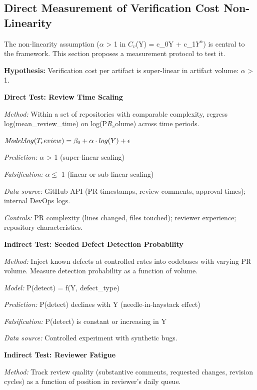 \documentclass[11pt,a4paper]{article}
\begin{document}
\hypertarget{a.-direct-measurement-of-verification-cost-non-linearity}{%
\subsection{Direct Measurement of Verification Cost Non-Linearity}\label{a.-direct-measurement-of-verification-cost-non-linearity}}

The non-linearity assumption ($\alpha$ > 1 in $C_v$(Y) = c\_0Y + c\_1$Y^{\alpha}$) is central to the framework. This section proposes a measurement protocol to test it.

\textbf{Hypothesis:} Verification cost per artifact is super-linear in artifact volume: $\alpha$ > 1.

\textbf{Direct Test: Review Time Scaling}

\emph{Method:} Within a set of repositories with comparable complexity, regress log(mean\_review\_time) on log(P$R_v$olume) across time periods.

$\emph{Model:} log(T_review) = \beta_0 + \alpha \cdot log(Y) + \epsilon$

\emph{Prediction:} $\alpha$ > 1 (super-linear scaling)

\emph{Falsification:} $\alpha \leq$ 1 (linear or sub-linear scaling)

\emph{Data source:} GitHub API (PR timestamps, review comments, approval times); internal DevOps logs.

\emph{Controls:} PR complexity (lines changed, files touched); reviewer experience; repository characteristics.

\textbf{Indirect Test: Seeded Defect Detection Probability}

\emph{Method:} Inject known defects at controlled rates into codebases with varying PR volume. Measure detection probability as a function of volume.

\emph{Model:} P(detect) = f(Y, defect\_type)

\emph{Prediction:} P(detect) declines with Y (needle-in-haystack effect)

\emph{Falsification:} P(detect) is constant or increasing in Y

\emph{Data source:} Controlled experiment with synthetic bugs.

\textbf{Indirect Test: Reviewer Fatigue}

\emph{Method:} Track review quality (substantive comments, requested changes, revision cycles) as a function of position in reviewer's daily queue.
\end{document}
